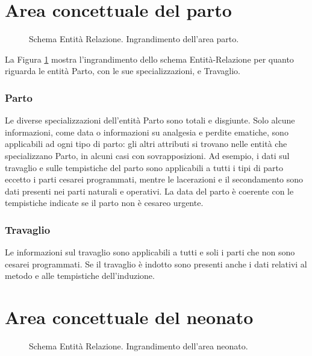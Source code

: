 \section{Area concettuale del parto}

\begin{figure}
    \centering
    
    \caption{Schema Entità Relazione. Ingrandimento dell'area parto.}
    \label{deliveryerdiagram}
\end{figure}

La Figura \ref{deliveryerdiagram} mostra l'ingrandimento dello schema Entità-Relazione per quanto riguarda le entità Parto, con le sue specializzazioni, e Travaglio.

\subsubsection{Parto}

Le diverse specializzazioni dell'entità Parto sono totali e disgiunte.
Solo alcune informazioni, come data o informazioni su analgesia e perdite ematiche, sono applicabili ad ogni tipo di parto: gli altri attributi si trovano nelle entità che specializzano Parto, in alcuni casi con sovrapposizioni.
Ad esempio, i dati sul travaglio e sulle tempistiche del parto sono applicabili a tutti i tipi di parto eccetto i parti cesarei programmati, mentre le lacerazioni e il secondamento sono dati presenti nei parti naturali e operativi.
La data del parto è coerente con le tempistiche indicate se il parto non è cesareo urgente.

\subsubsection{Travaglio}

Le informazioni sul travaglio sono applicabili a tutti e soli i parti che non sono cesarei programmati.
Se il travaglio è indotto sono presenti anche i dati relativi al metodo e alle tempistiche dell'induzione.

\section{Area concettuale del neonato}

\begin{figure}
    \label{newbornerdiagram}
    \centering
    
    \caption{Schema Entità Relazione. Ingrandimento dell'area neonato.}
\end{figure}

